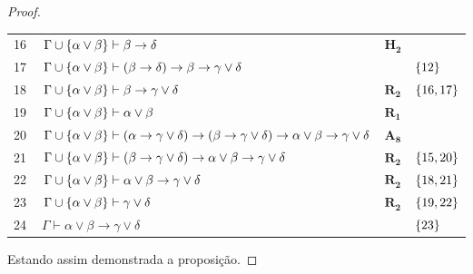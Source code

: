 \begin{tcolorbox}[enhanced jigsaw, breakable, sharp corners, colframe=black, colback=white, boxrule=0.5pt, left=1.5mm, right=1.5mm, top=1.5mm, bottom=1.5mm]
\begin{lemma}
\begin{proof}
\begin{xltabular}{\textwidth}{r | X l l}
            \scriptsize{16}\phantom{ }           & $\ \Gamma\cup\set{\alpha\vee\beta}\vdash\beta\to\delta$                                                                                 & $\mathbf{H_2}$                                     & \\[\rowskip]
            \scriptsize{17}\phantom{ }           & $\ \Gamma\cup\set{\alpha\vee\beta}\vdash(\beta\to\delta)\to\beta\to\gamma\vee\delta$                                                    &                                & $\left\{12\right\}$\\[\rowskip]
            \scriptsize{18}\phantom{ }           & $\ \Gamma\cup\set{\alpha\vee\beta}\vdash\beta\to\gamma\vee\delta$                                                                       & $\hyperref[modal.rule.2]{\mathbf{R_2}}$            & $\left\{16,17\right\}$\\[\rowskip]
            \scriptsize{19}\phantom{ }           & $\ \Gamma\cup\set{\alpha\vee\beta}\vdash\alpha\vee\beta$                                                                                & $\hyperref[modal.rule.1]{\mathbf{R_1}}$            & \\[\rowskip]
            \scriptsize{20}\phantom{ }           & $\ \Gamma\cup\set{\alpha\vee\beta}\vdash(\alpha\to\gamma\vee\delta)\to(\beta\to\gamma\vee\delta)\to\alpha\vee\beta\to\gamma\vee\delta$  & $\hyperref[modal.axiom.8]{\mathbf{A_8}}$           & \\[\rowskip]
            \scriptsize{21}\phantom{ }           & $\ \Gamma\cup\set{\alpha\vee\beta}\vdash(\beta\to\gamma\vee\delta)\to\alpha\vee\beta\to\gamma\vee\delta$                                & $\hyperref[modal.rule.2]{\mathbf{R_2}}$            & $\left\{15,20\right\}$\\[\rowskip]
            \scriptsize{22}\phantom{ }           & $\ \Gamma\cup\set{\alpha\vee\beta}\vdash\alpha\vee\beta\to\gamma\vee\delta$                                                             & $\hyperref[modal.rule.2]{\mathbf{R_2}}$            & $\left\{18,21\right\}$\\[\rowskip]
            \scriptsize{23}\phantom{ }           & $\ \Gamma\cup\set{\alpha\vee\beta}\vdash\gamma\vee\delta$                                                                               & $\hyperref[modal.rule.2]{\mathbf{R_2}}$            & $\left\{19,22\right\}$\\[\rowskip]
            \scriptsize{24}\phantom{ }           & $\ \Gamma\vdash\alpha\vee\beta\to\gamma\vee\delta$                                                                                      &                                & $\left\{23\right\}$
        \end{xltabular}
        \normalsize

        \vspace{0.5\baselineskip}
        Estando assim demonstrada a proposição.
        \end{proof}
    \end{lemma}
\end{tcolorbox}

